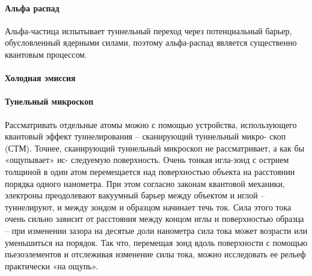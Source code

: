 \paragraph{Альфа распад}
Альфа-частица испытывает туннельный переход через потенциальный барьер, обусловленный
ядерными силами, поэтому альфа-распад является существенно квантовым процессом.

\paragraph{Холодная эмиссия}


\paragraph{Тунельный микроскоп}
Рассматривать отдельные атомы можно с помощью устройства, использующего квантовый эффект
туннелирования – сканирующий туннельный микро- скоп (СТМ). Точнее, сканирующий туннельный
микроскоп не рассматривает, а как бы «ощупывает» ис- следуемую поверхность. Очень тонкая
игла-зонд с острием толщиной в один атом перемещается над поверхностью объекта на расстоянии
порядка одного нанометра. При этом согласно законам квантовой механики, электроны преодолевают
вакуумный барьер между объектом и иглой – туннелируют, и между зондом и образцом начинает
течь ток. Сила этого тока очень сильно зависит от расстояния между концом иглы и поверхностью
образца – при изменении зазора на десятые доли нанометра сила тока может возрасти или
уменьшиться на порядок. Так что, перемещая зонд вдоль поверхности с помощью пьезоэлементов
и отслеживая изменение силы тока, можно исследовать ее рельеф практически «на ощупь».

